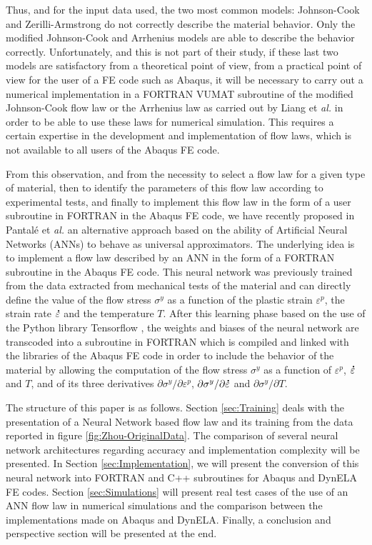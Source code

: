 \documentclass[algorithms,article,submit,pdftex,moreauthors]{Definitions/mdpi}
\makeatletter
\DeclareRobustCommand{\mdot}[1]{\accentset{\mbox{\bfseries .}}{#1}}
\DeclareRobustCommand{\eal}{et \emph{al.}\@\xspace}
\makeatother
\begin{document}
Thus, and for the input data used, the two most common models: Johnson-Cook and Zerilli-Armstrong do not correctly describe the material behavior.
Only the modified Johnson-Cook and Arrhenius models are able to describe the behavior correctly.
Unfortunately, and this is not part of their study, if these last two models are satisfactory from a theoretical point of view, from a practical point of view for the user of a FE code such as Abaqus, it will be necessary to carry out a numerical implementation in a FORTRAN VUMAT subroutine of the modified Johnson-Cook flow law or the Arrhenius law as carried out by Liang \eal \cite{Liang-2022} in order to be able to use these laws for numerical simulation.
This requires a certain expertise in the development and implementation of flow laws, which is not available to all users of the Abaqus FE code.

From this observation, and from the necessity to select a flow law for a given type of material, then to identify the parameters of this flow law according to experimental tests, and finally to implement this flow law in the form of a user subroutine in FORTRAN in the Abaqus FE code, we have recently proposed in Pantalé \eal \cite{Pantale-2021} an alternative approach based on the ability of Artificial Neural Networks (ANNs) to behave as universal approximators.
The underlying idea is to implement a flow law described by an ANN in the form of a FORTRAN subroutine in the Abaqus FE code.
This neural network was previously trained from the data extracted from mechanical tests of the material and can directly define the value of the flow stress $\sigma^y$ as a function of the plastic strain $\varepsilon^p$, the strain rate $\mdot\varepsilon$ and the temperature $T$.
After this learning phase based on the use of the Python library Tensorflow \cite{Abadi-2016}, the weights and biases of the neural network are transcoded into a subroutine in FORTRAN which is compiled and linked with the libraries of the Abaqus FE code in order to include the behavior of the material by allowing the computation of the flow stress $\sigma^y$ as a function of $\varepsilon^p$, $\mdot\varepsilon$ and $T$, and of its three derivatives $\partial\sigma^y/\partial\varepsilon^p$, $\partial\sigma^y/\partial\mdot\varepsilon$ and $\partial\sigma^y/\partial T$.

The structure of this paper is as follows.
Section \ref{sec:Training} deals with the presentation of a Neural Network based flow law and its training from the data reported in figure \ref{fig:Zhou-OriginalData}.
The comparison of several neural network architectures regarding accuracy and implementation complexity will be presented.
In Section \ref{sec:Implementation}, we will present the conversion of this neural network into FORTRAN and C++ subroutines for Abaqus and DynELA FE codes.
Section \ref{sec:Simulations} will present real test cases of the use of an ANN flow law in numerical simulations and the comparison between the implementations made on Abaqus and DynELA.
Finally, a conclusion and perspective section will be presented at the end.
\end{document}
